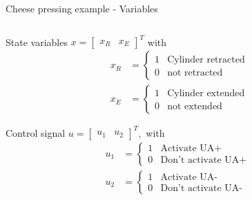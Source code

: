 \documentclass[presentation,aspectratio=1610]{beamer}
\begin{document}
\begin{frame}[label={sec:orgb73ed93}]{Cheese pressing example - Variables}
\begin{columns}
\begin{column}{0.5\columnwidth}
\begin{block}{State variables}
\(x = \begin{bmatrix} x_R & x_E \end{bmatrix}^T\) with
\begin{align*}
x_R &= \begin{cases} 1 & \text{Cylinder retracted}\\0 & \text{not retracted}\end{cases}\\
x_E &= \begin{cases} 1 & \text{Cylinder extended}\\0 & \text{not extended}\end{cases}
\end{align*}
\end{block}
\begin{block}{Control signal}
\(u = \begin{bmatrix} u_1 & u_2 \end{bmatrix}^T,\) with
\begin{align*}
u_1 &= \begin{cases} 1 & \text{Activate UA+}\\0 & \text{Don't activate UA+ }\end{cases}\\
u_2 &= \begin{cases} 1 & \text{Activate UA-}\\0 & \text{Don't activate UA-}\end{cases}
\end{align*}
\end{block}
\end{column}


\end{columns}
\end{frame}
\end{document}
